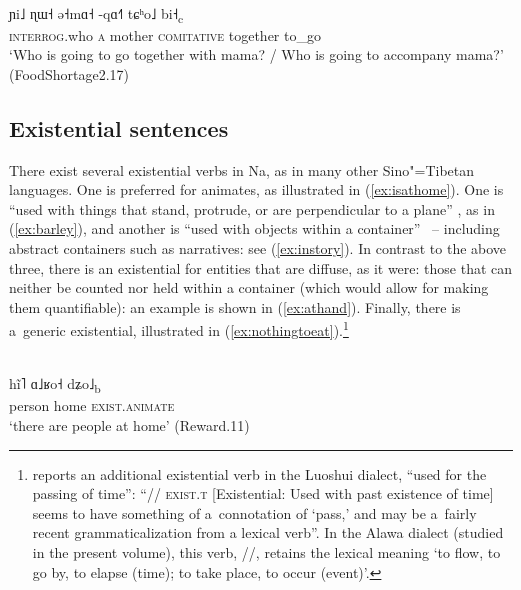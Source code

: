 \begin{exe}
	\ex
	\label{ex:whogoeswithmother}
	\\
	\gll ɲi˩		ɳɯ˧						ə˧mɑ˧		-qɑ˧˥						tɕʰo˩	bi˧\textsubscript{c}\\
	\textsc{interrog}.who		\textsc{a}		mother		\textsc{comitative}		together				to\_go\\
	\glt ‘Who is going to go together with mama? / Who is going to accompany mama?’ (FoodShortage2.17)
\end{exe}




\subsection{Existential sentences}
\label{sec:existential}
There exist several existential verbs in Na, as in many other {Sino"=Tibetan} languages. One is preferred for animates, as illustrated in (\ref{ex:isathome}). One is “used with things that stand, protrude, or are perpendicular to a
plane” \citep[358]{lidz2010}, as in (\ref{ex:barley}), and another is “used with objects within a container” \citep[361]{lidz2010}~-- including abstract containers such as narratives: see (\ref{ex:instory}). In contrast to the above three, there is an existential for entities that are diffuse, as it were: those that can neither be counted nor held within a container (which would allow for making them quantifiable): an example is shown in (\ref{ex:athand}). Finally, there is a~generic existential, illustrated in (\ref{ex:nothingtoeat}).\footnote{\citet[359]{lidz2010} reports an additional {existential} verb in the Luoshui dialect, “used for the passing of time”: “// \textsc{exist.t} [Existential: Used with past existence of time] seems to have something of a~connotation of ‘pass,’ and may be a~fairly recent {grammaticalization} from a lexical verb”. In the Alawa dialect (studied in the present volume), this verb, //, retains the lexical meaning ‘to flow, to go by, to elapse (time); to take place, to occur (event)’.}

\begin{exe}
	\ex
	\label{ex:isathome}
	\\
	\gll hĩ˥		ɑ˩ʁo˧		dʑo˩\textsubscript{b}\\
	person		home		\textsc{exist.animate}\\
	\glt ‘there are people at home’ (Reward.11)
\end{exe}

